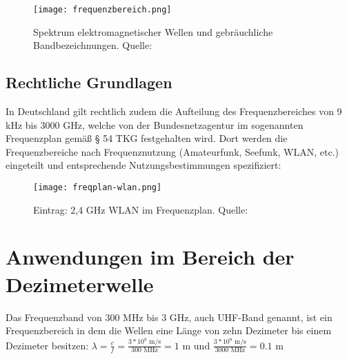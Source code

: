 \begin{figure}[ht]
	\centering
	\texttt{[image: frequenzbereich.png]}
	\caption[Spektrum elektromagnetischer Wellen und gebräuchliche Bandbezeichnungen]{Spektrum elektromagnetischer Wellen und gebräuchliche Bandbezeichnungen. Quelle: \cite[Kark, S. 1]{Kark:2017}} 
	\label{frequenzbereiche}
\end{figure}






\subsection{Rechtliche Grundlagen} %
In Deutschland gilt rechtlich zudem die Aufteilung des Frequenzbereiches von 9 kHz bis 3000 GHz, welche von der Bundesnetzagentur im sogenannten Frequenzplan \cite[Bundesnetzagentur, 2016]{bundesnetzagentur-frequenzplan:2016} gemäß § 54 TKG festgehalten wird.
Dort werden die Frequenzbereiche nach Frequenznutzung (Amateurfunk, Seefunk, WLAN, etc.) eingeteilt und entsprechende Nutzungsbestimmungen spezifiziert:

\begin{figure}[ht]
	\centering
	\texttt{[image: freqplan-wlan.png]}
	\caption[Eintrag: 2,4 GHz WLAN im Frequenzplan]{Eintrag: 2,4 GHz WLAN im Frequenzplan. Quelle: \cite[Bundesnetzagentur, 2016]{bundesnetzagentur-frequenzplan:2016}}
	\label{frequenzplan-wlan}
\end{figure}







\section{Anwendungen im Bereich der Dezimeterwelle}
Das Frequenzband von 300 MHz bis 3 GHz, auch \ac{UHF}-Band genannt, ist ein Frequenzbereich in dem die Wellen eine Länge von zehn Dezimeter bis einem Dezimeter besitzen:
\( \lambda = \frac{c}{f} = \frac{3*10^8 \text{ m/s}}{300 \text{ MHz}} = 1\text{ m}\)
und
\( \frac{3*10^8 \text{ m/s}}{3000 \text{ MHz}} = 0.1\text{ m}\)






